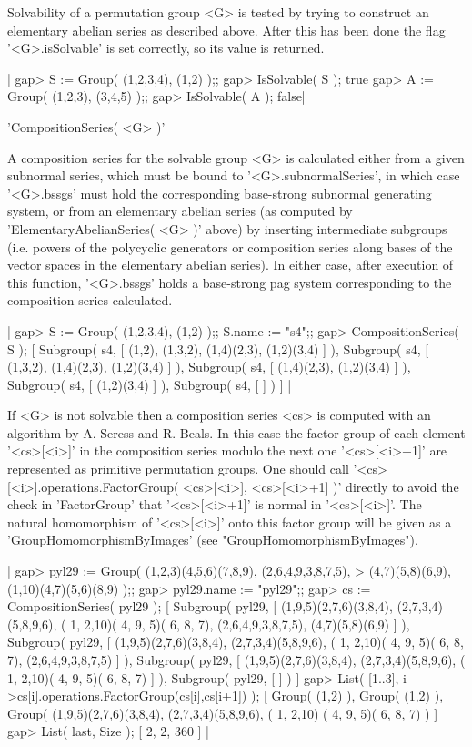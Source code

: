 Solvability of a  permutation group <G> is tested  by trying to construct
an elementary abelian  series  as described  above.  After this has  been
done  the  flag  '<G>.isSolvable' is  set  correctly,  so  its  value  is
returned.

|    gap> S := Group( (1,2,3,4), (1,2) );;
    gap> IsSolvable( S );
    true
    gap> A := Group( (1,2,3), (3,4,5) );;
    gap> IsSolvable( A );
    false|

\vspace{5mm}
'CompositionSeries( <G> )'%

A composition series for the solvable group <G> is calculated either from
a given subnormal  series, which must be bound to  '<G>.subnormalSeries',
in  which  case  '<G>.bssgs'  must  hold  the  corresponding  base-strong
subnormal  generating system,  or  from an elementary abelian  series (as
computed  by   'ElementaryAbelianSeries(   <G>  )'  above)  by  inserting
intermediate subgroups  (i.e.   powers  of  the  polycyclic generators or
composition  series along bases  of the vector spaces in  the  elementary
abelian  series).   In either  case,  after  execution  of this function,
'<G>.bssgs'  holds  a  base-strong   pag   system  corresponding  to  the
composition series calculated.

|    gap> S := Group( (1,2,3,4), (1,2) );; S.name := "s4";;
    gap> CompositionSeries( S );
    [ Subgroup( s4, [ (1,2), (1,3,2), (1,4)(2,3), (1,2)(3,4) ] ),
      Subgroup( s4, [ (1,3,2), (1,4)(2,3), (1,2)(3,4) ] ),
      Subgroup( s4, [ (1,4)(2,3), (1,2)(3,4) ] ),
      Subgroup( s4, [ (1,2)(3,4) ] ), Subgroup( s4, [  ] ) ] |

If <G> is not solvable then a composition series <cs> is computed with an
algorithm by A. Seress and R.  Beals.  In this case the  factor  group of
each  element '<cs>[<i>]' in the composition  series modulo  the next one
'<cs>[<i>+1]'  are  represented as  primitive  permutation  groups.   One
should call '<cs>[<i>].operations.FactorGroup( <cs>[<i>], <cs>[<i>+1]  )'
directly to avoid the check in 'FactorGroup' that '<cs>[<i>+1]' is normal
in '<cs>[<i>]'.  The natural homomorphism of '<cs>[<i>]' onto this factor
group    will   be   given   as    a   'GroupHomomorphismByImages'   (see
"GroupHomomorphismByImages").

|    gap> pyl29 := Group( (1,2,3)(4,5,6)(7,8,9), (2,6,4,9,3,8,7,5),
    >                     (4,7)(5,8)(6,9), (1,10)(4,7)(5,6)(8,9) );;
    gap> pyl29.name := "pyl29";;
    gap> cs := CompositionSeries( pyl29 );
    [ Subgroup( pyl29, [ (1,9,5)(2,7,6)(3,8,4), (2,7,3,4)(5,8,9,6),
          ( 1, 2,10)( 4, 9, 5)( 6, 8, 7), (2,6,4,9,3,8,7,5),
          (4,7)(5,8)(6,9) ] ),
      Subgroup( pyl29, [ (1,9,5)(2,7,6)(3,8,4), (2,7,3,4)(5,8,9,6),
          ( 1, 2,10)( 4, 9, 5)( 6, 8, 7), (2,6,4,9,3,8,7,5) ] ),
      Subgroup( pyl29, [ (1,9,5)(2,7,6)(3,8,4), (2,7,3,4)(5,8,9,6),
          ( 1, 2,10)( 4, 9, 5)( 6, 8, 7) ] ), Subgroup( pyl29, [  ] ) ]
    gap> List( [1..3], i->cs[i].operations.FactorGroup(cs[i],cs[i+1]) );
    [ Group( (1,2) ), Group( (1,2) ),
      Group( (1,9,5)(2,7,6)(3,8,4), (2,7,3,4)(5,8,9,6), ( 1, 2,10)
        ( 4, 9, 5)( 6, 8, 7) ) ]
    gap> List( last, Size );
    [ 2, 2, 360 ] |

